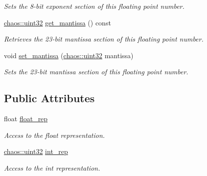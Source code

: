 \begin{DoxyCompactItemize}
\begin{DoxyCompactList}\small\item\em Sets the 8-\/bit exponent section of this floating point number. \end{DoxyCompactList}\item 
\hypertarget{unionchaos_1_1data_1_1_bitwise_float_afe4e313f09b01b6492a0dffce0d47b0b}{\hyperlink{namespacechaos_a8641b3ae4551f0b35570d4f9f4ec22d9}{chaos\-::uint32} \hyperlink{unionchaos_1_1data_1_1_bitwise_float_afe4e313f09b01b6492a0dffce0d47b0b}{get\-\_\-mantissa} () const }\label{unionchaos_1_1data_1_1_bitwise_float_afe4e313f09b01b6492a0dffce0d47b0b}

\begin{DoxyCompactList}\small\item\em Retrieves the 23-\/bit mantissa section of this floating point number. \end{DoxyCompactList}\item 
void \hyperlink{unionchaos_1_1data_1_1_bitwise_float_a57629a8a0c7aaff58ba05bcab7831ce6}{set\-\_\-mantissa} (\hyperlink{namespacechaos_a8641b3ae4551f0b35570d4f9f4ec22d9}{chaos\-::uint32} mantissa)
\begin{DoxyCompactList}\small\item\em Sets the 23-\/bit mantissa section of this floating point number. \end{DoxyCompactList}\end{DoxyCompactItemize}
\subsection*{Public Attributes}
\begin{DoxyCompactItemize}
\item 
\hypertarget{unionchaos_1_1data_1_1_bitwise_float_ab763103c6f0079798d187c8c27612259}{float \hyperlink{unionchaos_1_1data_1_1_bitwise_float_ab763103c6f0079798d187c8c27612259}{float\-\_\-rep}}\label{unionchaos_1_1data_1_1_bitwise_float_ab763103c6f0079798d187c8c27612259}

\begin{DoxyCompactList}\small\item\em Access to the float representation. \end{DoxyCompactList}\item 
\hypertarget{unionchaos_1_1data_1_1_bitwise_float_a5dc7a9d68bc17cecceec14da1ac9b592}{\hyperlink{namespacechaos_a8641b3ae4551f0b35570d4f9f4ec22d9}{chaos\-::uint32} \hyperlink{unionchaos_1_1data_1_1_bitwise_float_a5dc7a9d68bc17cecceec14da1ac9b592}{int\-\_\-rep}}\label{unionchaos_1_1data_1_1_bitwise_float_a5dc7a9d68bc17cecceec14da1ac9b592}

\begin{DoxyCompactList}\small\item\em Access to the int representation. \end{DoxyCompactList}\end{DoxyCompactItemize}


